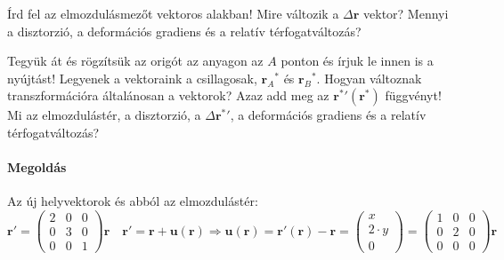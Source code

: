 \documentclass[12pt,a4paper]{scrartcl}
\let\mathbf\bm
\begin{document}
Írd fel az elmozdulásmezőt vektoros alakban! Mire változik a $\Delta {\mathbf{r}}$ vektor? Mennyi a disztorzió, a deformációs gradiens és a relatív térfogatváltozás?

Tegyük át és rögzítsük az origót az anyagon az $A$ ponton és írjuk le innen is a nyújtást! Legyenek a vektoraink a csillagosak, ${{\mathbf{r}}_A}^*$ és ${{\mathbf{r}}_B}^*$. Hogyan változnak transzformációra általánosan a vektorok? Azaz add meg az ${\mathbf{r}}{{^*}'}\left( {{{\mathbf{r}}^ * }} \right)$ függvényt! Mi az elmozdulástér, a disztorzió, a $\Delta {{\mathbf{r}}^ * }'$, a deformációs gradiens és a relatív térfogatváltozás?

\paragraph{Megoldás}
Az új helyvektorok és abból az elmozdulástér:
\[{\mathbf{r}}' = \left( {\begin{array}{*{20}{c}}
  2&0&0 \\ 
  0&3&0 \\ 
  0&0&1 
\end{array}} \right){\mathbf{r}}\quad {\mathbf{r}}' = {\mathbf{r}} + {\mathbf{u}}\left( {\mathbf{r}} \right) \Rightarrow {\mathbf{u}}\left( {\mathbf{r}} \right) = {\mathbf{r}}'\left( {\mathbf{r}} \right) - {\mathbf{r}} = \left( {\begin{array}{*{20}{c}}
  x \\ 
  {2 \cdot y} \\ 
  0 
\end{array}} \right) = \left( {\begin{array}{*{20}{c}}
  1&0&0 \\ 
  0&2&0 \\ 
  0&0&0 
\end{array}} \right){\mathbf{r}}\]
\end{document}
